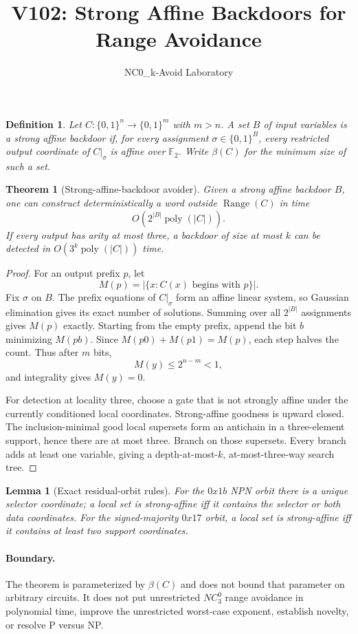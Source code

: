 \documentclass[11pt]{article}
\title{V102: Strong Affine Backdoors for Range Avoidance}
\author{NC0\_k-Avoid Laboratory}
\date{}
\newtheorem{theorem}{Theorem}
\newtheorem{lemma}{Lemma}
\newtheorem{definition}{Definition}
\begin{document}
\maketitle

\begin{definition}
Let $C:\{0,1\}^n\to\{0,1\}^m$ with $m>n$. A set $B$ of input variables is a
\emph{strong affine backdoor} if, for every assignment
$\sigma\in\{0,1\}^B$, every restricted output coordinate of $C|_\sigma$ is
affine over $\mathbb F_2$. Write $\beta(C)$ for the minimum size of such a set.
\end{definition}

\begin{theorem}[Strong-affine-backdoor avoider]
Given a strong affine backdoor $B$, one can construct deterministically a word
outside $\operatorname{Range}(C)$ in time
\[
  O\!\left(2^{|B|}\operatorname{poly}(|C|)\right).
\]
If every output has arity at most three, a backdoor of size at most $k$ can be
detected in $O(3^k\operatorname{poly}(|C|))$ time.
\end{theorem}

\begin{proof}
For an output prefix $p$, let
\[
 M(p)=|\{x:C(x)\text{ begins with }p\}|.
\]
Fix $\sigma$ on $B$. The prefix equations of $C|_\sigma$ form an affine linear
system, so Gaussian elimination gives its exact number of solutions. Summing
over all $2^{|B|}$ assignments gives $M(p)$ exactly. Starting from the empty
prefix, append the bit $b$ minimizing $M(pb)$. Since
$M(p0)+M(p1)=M(p)$, each step halves the count. Thus after $m$ bits,
\[
 M(y)\le 2^{n-m}<1,
\]
and integrality gives $M(y)=0$.

For detection at locality three, choose a gate that is not strongly affine
under the currently conditioned local coordinates. Strong-affine goodness is
upward closed. The inclusion-minimal good local supersets form an antichain in
a three-element support, hence there are at most three. Branch on those
supersets. Every branch adds at least one variable, giving a depth-at-most-$k$,
at-most-three-way search tree.
\end{proof}

\begin{lemma}[Exact residual-orbit rules]
For the $0x1b$ NPN orbit there is a unique selector coordinate; a local set is
strong-affine iff it contains the selector or both data coordinates. For the
signed-majority $0x17$ orbit, a local set is strong-affine iff it contains at
least two support coordinates.
\end{lemma}

\paragraph{Boundary.}
The theorem is parameterized by $\beta(C)$ and does not bound that parameter on
arbitrary circuits. It does not put unrestricted $NC^0_3$ range avoidance in
polynomial time, improve the unrestricted worst-case exponent, establish
novelty, or resolve P versus NP.
\end{document}

